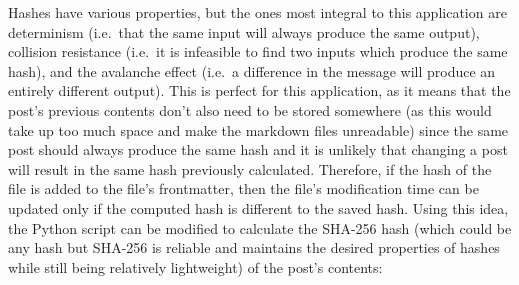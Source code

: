 \documentclass[titlepage]{article}
\begin{document}
        Hashes have various properties, but the ones most integral to this
        application are determinism (i.e.~that the same input will always
        produce the same output), collision resistance (i.e.~it is infeasible to
        find two inputs which produce the same hash), and the avalanche effect
        (i.e.~a difference in the message will produce an entirely different
        output). This is perfect for this application, as it means that the
        post's previous contents don't also need to be stored somewhere (as this
        would take up too much space and make the markdown files unreadable)
        since the same post should always produce the same hash and it is
        unlikely that changing a post will result in the same hash previously
        calculated. Therefore, if the hash of the file is added to the file's
        frontmatter, then the file's modification time can be updated only if
        the computed hash is different to the saved hash. Using this idea, the
        Python script can be modified to calculate the SHA-256 hash (which could
        be any hash but SHA-256 is reliable and maintains the desired properties
        of hashes while still being relatively lightweight) of the post's
        contents:
\end{document}
